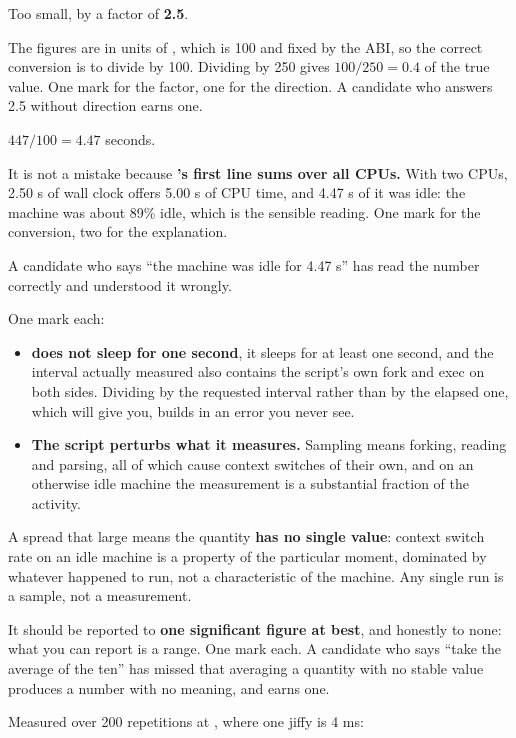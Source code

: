 Too small, by a factor of \textbf{2.5}.

The figures are in units of , which is 100 and fixed by the ABI, so the correct
conversion is to divide by 100. Dividing by 250 gives $100/250 = 0.4$ of the true value. One mark
for the factor, one for the direction. A candidate who answers 2.5 without direction earns one.

$447 / 100 = 4.47$ seconds.

It is not a mistake because \textbf{'s first line sums over all CPUs.} With two
CPUs, 2.50 s of wall clock offers 5.00 s of CPU time, and 4.47 s of it was idle: the machine was
about 89\% idle, which is the sensible reading. One mark for the conversion, two for the
explanation.

A candidate who says ``the machine was idle for 4.47 s'' has read the number correctly and
understood it wrongly.

One mark each:
\begin{itemize}
  \item \textbf{ does not sleep for one second}, it sleeps for at least one second,
    and the interval actually measured also contains the script's own fork and exec on both sides.
    Dividing by the requested interval rather than by the elapsed one, which 
    will give you, builds in an error you never see.
  \item \textbf{The script perturbs what it measures.} Sampling  means forking,
    reading and parsing, all of which cause context switches of their own, and on an otherwise idle
    machine the measurement is a substantial fraction of the activity.
\end{itemize}

A spread that large means the quantity \textbf{has no single value}: context switch
rate on an idle machine is a property of the particular moment, dominated by whatever happened to
run, not a characteristic of the machine. Any single run is a sample, not a measurement.

It should be reported to \textbf{one significant figure at best}, and honestly to none: what you can
report is a range. One mark each. A candidate who says ``take the average of the ten'' has missed
that averaging a quantity with no stable value produces a number with no meaning, and earns one.

Measured over 200 repetitions at , where one jiffy is 4 ms:

